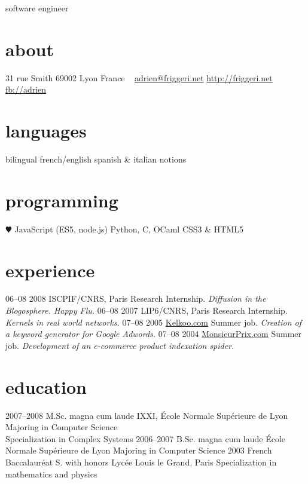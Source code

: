 \documentclass[]{friggeri-cv}
\begin{document}
{software engineer}

\begin{aside}
    \section{about}
    31 rue Smith
    69002 Lyon
    France
    ~
    \href{mailto:adrien@friggeri.net}{adrien@friggeri.net}
    \href{http://friggeri.net}{http://friggeri.net}
    \href{http://facebook.com/adrien}{fb://adrien}
    \section{languages}
    bilingual french/english
    spanish \& italian notions
    \section{programming}
    {\color{red} $\varheartsuit$} JavaScript
    (ES5, node.js)
    Python, C, OCaml
    CSS3 \& HTML5
\end{aside}


\section{experience}

\begin{entrylist}
	\entry
	{06–08 2008}
	{ISCPIF/CNRS, Paris}
	{Research Internship.}
	{\emph{Diffusion in the Blogosphere. Happy Flu.}}
	\entry
	{06–08 2007}
	{LIP6/CNRS, Paris}
	{Research Internship.}
	{\emph{Kernels in real world networks.}}
	\entry
	{07–08 2005}
	{\href{http://www.kelkoo.com}{Kelkoo.com}}
	{Summer job.}
	{\emph{Creation of a keyword generator for Google Adwords.}}
	\entry
	{07–08 2004}
	{\href{http://www.monsieurprix.com}{MonsieurPrix.com}}
	{Summer job.}
	{\emph{Development of an e-commerce product indexation spider.}}
\end{entrylist}

\section{education}

\begin{entrylist}
    \entry
    {2007–2008}
    {M.Sc. magna cum laude}
    {IXXI, École Normale Supérieure de Lyon}
    {Majoring in Computer Science\\
    Specialization in Complex Systems}
    \entry
    {2006–2007}
    {B.Sc. magna cum laude}
    {École Normale Supérieure de Lyon}
    {Majoring in Computer Science}
    \entry
    {2003}
    {French Baccalauréat S. with honors}
    {Lycée Louis le Grand, Paris}
    {Specialization in mathematics and physics}
\end{entrylist}
\end{document}
